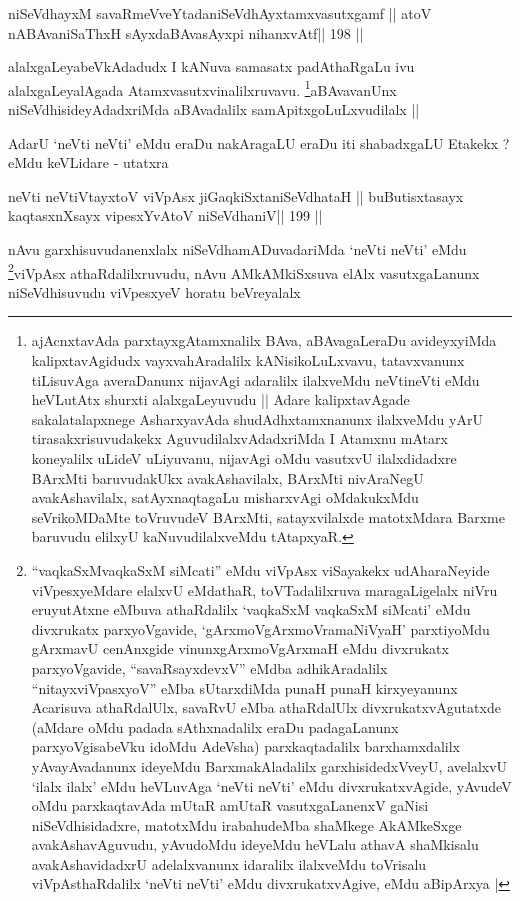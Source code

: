 \begin{shl}
niSeVdhayxM savaRmeVveYtadaniSeVdhAyxtamxvasutxgamf ||
atoV nABAvaniSaThxH sAyxdaBAvasAyxpi nihanxvAtf\hfill || 198 ||
\end{shl}

\begin{artha}
alalxgaLeyabeVkAdadudx I kANuva samasatx padAthaRgaLu ivu
alalxgaLeyalAgada
Atamxvasutxvinalilxruvavu. \footnote[1]{ajAcnxtavAda
  parxtayxgAtamxnalilx BAva, aBAvagaLeraDu avideyxyiMda
  kalipxtavAgidudx vayxvahAradalilx kANisikoLuLxvavu, tatavxvanunx
  tiLisuvAga averaDanunx nijavAgi adaralilx ilalxveMdu neVtineVti eMdu
heVLutAtx shurxti alalxgaLeyuvudu || Adare kalipxtavAgade
sakalatalapxnege AsharxyavAda shudAdhxtamxnanunx ilalxveMdu yArU
tirasakxrisuvudakekx AguvudilalxvAdadxriMda I Atamxnu mAtarx
koneyalilx uLideV uLiyuvanu, nijavAgi oMdu vasutxvU ilalxdidadxre
BArxMti baruvudakUkx avakAshavilalx, BArxMti nivAraNegU
avakAshavilalx, satAyxnaqtagaLu misharxvAgi oMdakukxMdu seVrikoMDaMte
toVruvudeV BArxMti, satayxvilalxde matotxMdara Barxme baruvudu elilxyU
kaNuvudilalxveMdu tAtapxyaR.}aBAvavanUnx niSeVdhisideyAdadxriMda aBAvadalilx samApitxgoLuLxvudilalx ||
\end{artha}

\begin{artha}
AdarU `neVti neVti' eMdu eraDu nakAragaLU eraDu iti shabadxgaLU
Etakekx ? eMdu keVLidare - utatxra
\end{artha}

\begin{shl}
neVti neVtiVtayxtoV viVpAsx jiGaqkiSxtaniSeVdhataH ||
buButisxtasayx kaqtasxnXsayx vipesxYvAtoV niSeVdhaniV\hfill || 199 ||
\end{shl}

\begin{artha}
nAvu garxhisuvudanenxlalx niSeVdhamADuvadariMda `neVti neVti'
eMdu \footnote[1]{``vaqkaSxMvaqkaSxM siMcati'' eMdu viVpAsx viSayakekx
  udAharaNeyide viVpesxyeMdare elalxvU eMdathaR, toVTadalilxruva
  maragaLigelalx niVru eruyutAtxne eMbuva athaRdalilx `vaqkaSxM
  vaqkaSxM siMcati' eMdu divxrukatx parxyoVgavide,
  `gArxmoVgArxmoVramaNiVyaH' parxtiyoMdu gArxmavU cenAnxgide
  vinunxgArxmoVgArxmaH eMdu divxrukatx parxyoVgavide,
  ``savaRsayxdevxV'' eMdba adhikAradalilx ``nitayxviVpasxyoV'' eMba
  sUtarxdiMda punaH punaH kirxyeyanunx Acarisuva athaRdalUlx, savaRvU
  eMba athaRdalUlx divxrukatxvAgutatxde (aMdare oMdu padada
  sAthxnadalilx eraDu padagaLanunx parxyoVgisabeVku idoMdu AdeVsha)
  parxkaqtadalilx barxhamxdalilx yAvayAvadanunx ideyeMdu
  BarxmakAladalilx garxhisidedxVveyU, avelalxvU `ilalx ilalx' eMdu
  heVLuvAga `neVti neVti' eMdu divxrukatxvAgide, yAvudeV oMdu
  parxkaqtavAda mUtaR amUtaR vasutxgaLanenxV gaNisi niSeVdhisidadxre,
  matotxMdu irabahudeMba shaMkege AkAMkeSxge avakAshavAguvudu,
  yAvudoMdu ideyeMdu heVLalu athavA shaMkisalu avakAshavidadxrU
  adelalxvanunx idaralilx ilalxveMdu toVrisalu viVpAsthaRdalilx `neVti
  neVti' eMdu divxrukatxvAgive, eMdu aBipArxya |}viVpAsx athaRdalilxruvudu, nAvu AMkAMkiSxsuva elAlx
vasutxgaLanunx niSeVdhisuvudu viVpesxyeV horatu beVreyalalx
\end{artha}

